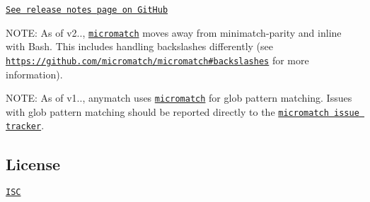 \href{https://github.com/micromatch/anymatch/releases}{\tt See release notes page on Git\+Hub}

N\+O\+TE\+: As of v2.., \href{https://github.com/jonschlinkert/micromatch}{\tt micromatch} moves away from minimatch-\/parity and inline with Bash. This includes handling backslashes differently (see \href{https://github.com/micromatch/micromatch#backslashes}{\tt https\+://github.\+com/micromatch/micromatch\#backslashes} for more information).

N\+O\+TE\+: As of v1.., anymatch uses \href{https://github.com/jonschlinkert/micromatch}{\tt micromatch} for glob pattern matching. Issues with glob pattern matching should be reported directly to the \href{https://github.com/jonschlinkert/micromatch/issues}{\tt micromatch issue tracker}.

\subsection*{License }

\href{https://raw.github.com/micromatch/anymatch/master/LICENSE}{\tt I\+SC} 